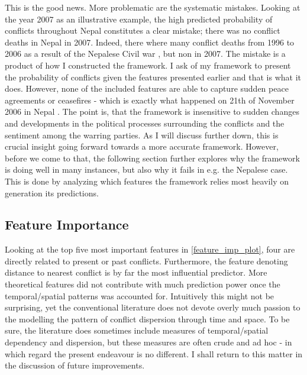 \documentclass[a4paper]{article}
\begin{document}
This is the good news. More problematic are the systematic mistakes. Looking at the year 2007 as an illustrative example, the high predicted probability of conflicts throughout Nepal constitutes a clear mistake; there was no conflict deaths in Nepal in 2007. Indeed, there where many conflict deaths from 1996 to 2006 as a result of the Nepalese Civil war \citep{ohchr2012nepal}, but non in 2007. The mistake is a product of how I constructed the framework. I ask of my framework to present the probability of conflicts given the features presented earlier and that is what it does. However, none of the included features are able to capture sudden peace agreements or ceasefires - which is exactly what happened on 21th of November 2006 in Nepal \citep{ohchr2012nepal}. The point is, that the framework is insensitive to sudden changes and developments in the political processes surrounding the conflicts and the sentiment among the warring parties. As I will discuss further down, this is crucial insight going forward towards a more accurate framework. However, before we come to that, the following section further explores why the framework is doing well in many instances, but also why it fails in e.g. the Nepalese case. This is done by analyzing which features the framework relies most heavily on generation its predictions.\par

\subsection{Feature Importance}

Looking at the top five most important features in \autoref{feature_imp_plot}, four are directly related to present or past conflicts. Furthermore, the feature denoting distance to nearest conflict is by far the most influential predictor. More theoretical features did not contribute with much prediction power once the temporal/spatial patterns was accounted for. Intuitively this might not be surprising, yet the conventional literature does not devote overly much passion to the modelling the pattern of conflict dispersion through time and space. To be sure, the literature does sometimes include measures of temporal/spatial dependency and dispersion, but these measures are often crude and ad hoc - in which regard the present endeavour is no different. I shall return to this matter in the discussion of future improvements.\par
\end{document}
